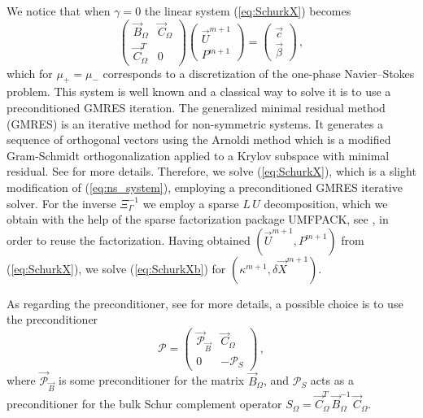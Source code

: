 \documentclass[a4paper,12pt,onecolumn]{article}
\begin{document}
We notice that when $\gamma = 0$ the linear system (\ref{eq:SchurkX}) becomes
\begin{equation} \label{eq:ns_system}
\begin{pmatrix}
\vec B_\Omega & \vec C_\Omega \\
\vec C_\Omega^T & 0
\end{pmatrix}
\begin{pmatrix}
\vec U^{m+1} \\ P^{m+1}
\end{pmatrix}
= \begin{pmatrix}
\vec c \\
\vec \beta
\end{pmatrix}\,,
\end{equation}
which for $\mu_+=\mu_-$ corresponds to a discretization of the one-phase
Navier--Stokes problem. This system is well known and a classical way to solve
it is to use a preconditioned GMRES iteration. The generalized minimal residual
method (GMRES) is an iterative method for non-symmetric systems. It generates a
sequence of orthogonal vectors using the Arnoldi method which is a modified
Gram-Schmidt orthogonalization applied to a Krylov subspace with minimal
residual. See \cite{BarrettBCetal94} for more details. Therefore, we solve
(\ref{eq:SchurkX}), which is a slight modification of (\ref{eq:ns_system}),
employing a preconditioned GMRES iterative solver. For the inverse
$\Xi_\Gamma^{-1}$ we employ a sparse $L\,U$ decomposition, which we obtain with
the help of the sparse factorization package UMFPACK, see \cite{Davis04}, in
order to reuse the factorization. Having obtained $(\vec U^{m+1}, P^{m+1})$ from
(\ref{eq:SchurkX}), we solve (\ref{eq:SchurkXb}) for $(\kappa^{m+1}, \delta\vec
X^{m+1})$.

As regarding the preconditioner, see \cite{ElmanSW05} for more details, a
possible choice is to use the preconditioner
\begin{equation} \label{eq:ESW}
\mathcal{P} = \begin{pmatrix}
\vec{\mathcal{P}}_{\vec B} & \vec C_\Omega \\
0 & -\mathcal{P}_S
\end{pmatrix}\,,
\end{equation}
where $\vec{\mathcal{P}}_{\vec B}$ is some preconditioner for the matrix $\vec
B_\Omega$, and $\mathcal{P}_S$ acts as a preconditioner for the bulk Schur
complement operator $S_\Omega=\vec C^T_\Omega \,\vec B_\Omega^{-1}\,\vec
C_\Omega$.
\end{document}
